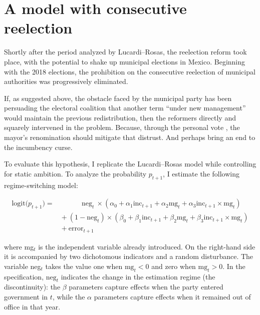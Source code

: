 \documentclass[letter,12pt]{article}
\begin{document}
\section{A model with consecutive reelection}

Shortly after the period analyzed by Lucardi--Rosas, the reelection reform took place, with the potential to shake up municipal elections in Mexico. Beginning with the 2018 elections, the prohibition on the consecutive reelection of municipal authorities was progressively eliminated.

If, as suggested above, the obstacle faced by the municipal party has been persuading the electoral coalition that another term ``under new management'' would maintain the previous redistribution, then the reformers directly and squarely intervened in the problem. Because, through the personal vote \citep{cain.etal.1987}, the mayor’s renomination should mitigate that distrust. And perhaps bring an end to the incumbency curse.


To evaluate this hypothesis, I replicate the Lucardi--Rosas model while controlling for static ambition. To analyze the probability $p_{t+1}$, I estimate the following regime-switching model:

\begin{equation}\label{E:model}
\begin{split}
\text{logit}\bigl(p_{t+1}\bigr) =~  & ~~~~~~~~~~~~~\text{neg}_t~ \times (\alpha_0 + \alpha_1 \text{inc}_{t+1} + \alpha_2 \text{mg}_t + \alpha_3 \text{inc}_{t+1} \times \text{mg}_t) \\
                                   & +~ (1 - \text{neg}_t) \times (\beta_0 + \beta_1 \text{inc}_{t+1} + \beta_2 \text{mg}_t + \beta_3 \text{inc}_{t+1} \times \text{mg}_t)  \\
 & +~ \text{error}_{t+1}
\end{split}
\end{equation}

\noindent where mg$_t$ is the independent variable already introduced. On the right-hand side it is accompanied by two dichotomous indicators and a random disturbance. The variable neg$_t$ takes the value one when $\text{mg}_t < 0$ and zero when $\text{mg}_t>0$. In the specification, $\text{neg}_t$ indicates the change in the estimation regime (the discontinuity): the $\beta$ parameters capture effects when the party entered government in $t$, while the $\alpha$ parameters capture effects when it remained out of office in that year.
\end{document}
